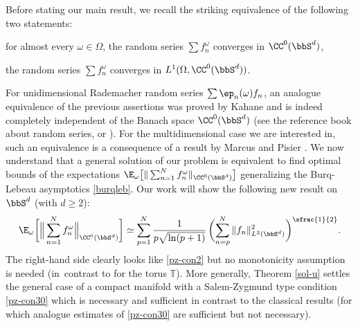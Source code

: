 Before stating our main result, we recall the striking equivalence of the following two statements:
\begin{enumeratei}
\item for almost every $\omega\in \Omega$, the random series $\sum f_n^\omega$ converges in $\CC^0(\bbS^d)$,
\item the random series $\sum f_n^\omega$ converges in $L^1(\Omega,\CC^0(\bbS^d))$.
\end{enumeratei}
For unidimensional Rademacher random series $\sum \ep_n(\omega)f_n$, an analogue equivalence of the previous assertions was proved by Kahane and is indeed completely independent of the Banach space $\CC^0(\bbS^d)$ (see the reference book \cite{kahane} about random series, \cite[p.\,142, Rem.\,1]{queff1} or \cite[p.\,43]{pisier1981}).
For the multidimensional case we are interested in, such an equivalence is a consequence of a result by Marcus and Pisier \cite[p.\,92]{pisier1981}.
We now understand that a general solution of our problem is equivalent to find optimal bounds of
the expectations
$\E_\omega\big[\| \sum_{n=1}^N f_n^\omega\|_{\CC^0(\bbS^d)}\big]$
generalizing the Burq-Lebeau asymptotics \eqref{burqleb}. Our work will show the following new result on~$\bbS^d$ (with $d\geq 2$):
\begin{equation}\label{newr}
\E_\omega\biggl[\Big\| \sum_{n=1}^N f_n^\omega \Big\|_{\CC^0(\bbS^d)}\biggr]\simeq \sum_{p=1}^N \frac{1}{p\sqrt{\ln(p+1)}}\, \biggl(\sum_{n=p}^N \|f_n\|_{L^2(\bbS^d)}^2 \biggr)^{\sfrac{1}{2}}.
\end{equation}
The right-hand side clearly looks like \eqref{pz-con2} but no monotonicity assumption is needed (in~contrast to \cite{marcus1975} for the torus $\mathbb{T}$).
More generally, Theorem \ref{sol-u} settles the general case of a compact manifold with a Salem-Zygmund type condition \eqref{pz-con30} which is necessary and sufficient in contrast to the classical results (for which analogue estimates of \eqref{pz-con30} are sufficient but not necessary).

